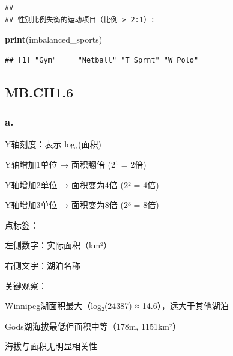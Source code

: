 \documentclass[
]{article}
\newenvironment{Shaded}{\begin{snugshade}}{\end{snugshade}}
\newcommand{\FunctionTok}[1]{\textcolor[rgb]{0.13,0.29,0.53}{\textbf{#1}}}
\newcommand{\NormalTok}[1]{#1}
\begin{document}
\begin{verbatim}
## 
## 性别比例失衡的运动项目（比例 > 2:1）:
\end{verbatim}

\begin{Shaded}
\begin{Highlighting}[]
\FunctionTok{print}\NormalTok{(imbalanced\_sports)}
\end{Highlighting}
\end{Shaded}

\begin{verbatim}
## [1] "Gym"     "Netball" "T_Sprnt" "W_Polo"
\end{verbatim}

\subsection{MB.CH1.6}\label{mb.ch1.6}

\subsubsection{a.}\label{a.-4}

Y轴刻度：表示 log₂(面积)

Y轴增加1单位 → 面积翻倍 (2¹ = 2倍)

Y轴增加2单位 → 面积变为4倍 (2² = 4倍)

Y轴增加3单位 → 面积变为8倍 (2³ = 8倍)

点标签：

左侧数字：实际面积（km²）

右侧文字：湖泊名称

关键观察：

Winnipeg湖面积最大（log₂(24387) ≈ 14.6），远大于其他湖泊

Gods湖海拔最低但面积中等（178m, 1151km²）

海拔与面积无明显相关性
\end{document}
